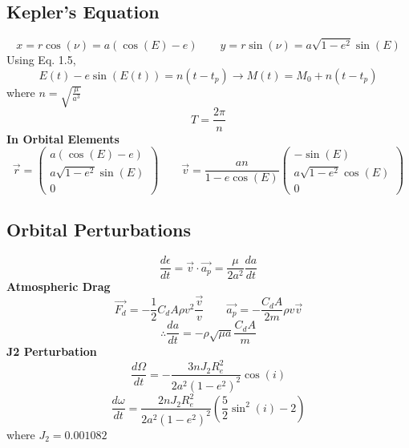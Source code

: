 \subsection{Kepler's Equation}
\begin{equation}
  x=r\cos(\nu) = a(\cos(E)-e) \qquad y=r\sin(\nu) = a\sqrt{1-e^2}\sin(E)
\end{equation}
Using Eq. 1.5,
\begin{equation}
  E(t) - e\sin(E(t))=n(t-t_p) \longrightarrow M(t) = M_0 + n(t-t_p)
\end{equation}
where $n=\sqrt{\frac{\mu}{a^3}}$
\begin{equation}
  T=\frac{2\pi}{n}
\end{equation}
\textbf{In Orbital Elements}
\begin{equation}
  \vec{r} = \begin{pmatrix}
       a(\cos(E)-e)\\
       a\sqrt{1-e^2}\sin(E)\\
       0
       \end{pmatrix} \qquad
  \vec{v} = \frac{an}{1-e\cos(E)}\begin{pmatrix}
       -\sin(E)\\
       a\sqrt{1-e^2}\cos(E)\\
       0
       \end{pmatrix}
\end{equation}

\subsection{Orbital Perturbations}

\begin{equation}
  \frac{d\epsilon}{dt} = \vec{v}\cdot\vec{a_p} = \frac{\mu}{2a^2}\frac{da}{dt}
\end{equation}
\textbf{Atmospheric Drag}
\begin{equation}
  \vec{F_d} = -\frac{1}{2}C_dA\rho v^2\frac{\vec{v}}{v} \qquad \vec{a_p} = -\frac{C_dA}{2m}\rho v\vec{v}
\end{equation}
\begin{equation}
  \therefore \frac{da}{dt}=-\rho\sqrt{\mu a}\frac{C_dA}{m}
\end{equation}
\textbf{J2 Perturbation}
\begin{equation}
  \frac{d\Omega}{dt}=-\frac{3nJ_2R_e^2}{2a^2(1-e^2)^2}\cos(i)
\end{equation}
\begin{equation}
  \frac{d\omega}{dt}=\frac{2nJ_2R_e^2}{2a^2(1-e^2)^2}\left(\frac{5}{2}\sin^2(i)-2\right)
\end{equation}
where $J_2=0.001082$
